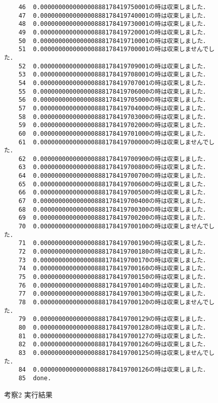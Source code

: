 \documentclass[12pt]{jarticle}
\begin{document}
\begin{figure}[t]
\begin{screen}
\small
\begin{verbatim}
    46	0.000000000000000888178419750001の時は収束しました．
    47	0.000000000000000888178419740001の時は収束しました．
    48	0.000000000000000888178419730001の時は収束しました．
    49	0.000000000000000888178419720001の時は収束しました．
    50	0.000000000000000888178419710001の時は収束しました．
    51	0.000000000000000888178419700001の時は収束しませんでした．
    52	0.000000000000000888178419709001の時は収束しました．
    53	0.000000000000000888178419708001の時は収束しました．
    54	0.000000000000000888178419707001の時は収束しました．
    55	0.000000000000000888178419706000の時は収束しました．
    56	0.000000000000000888178419705000の時は収束しました．
    57	0.000000000000000888178419704000の時は収束しました．
    58	0.000000000000000888178419703000の時は収束しました．
    59	0.000000000000000888178419702000の時は収束しました．
    60	0.000000000000000888178419701000の時は収束しました．
    61	0.000000000000000888178419700000の時は収束しませんでした．
    62	0.000000000000000888178419700900の時は収束しました．
    63	0.000000000000000888178419700800の時は収束しました．
    64	0.000000000000000888178419700700の時は収束しました．
    65	0.000000000000000888178419700600の時は収束しました．
    66	0.000000000000000888178419700500の時は収束しました．
    67	0.000000000000000888178419700400の時は収束しました．
    68	0.000000000000000888178419700300の時は収束しました．
    69	0.000000000000000888178419700200の時は収束しました．
    70	0.000000000000000888178419700100の時は収束しませんでした．
    71	0.000000000000000888178419700190の時は収束しました．
    72	0.000000000000000888178419700180の時は収束しました．
    73	0.000000000000000888178419700170の時は収束しました．
    74	0.000000000000000888178419700160の時は収束しました．
    75	0.000000000000000888178419700150の時は収束しました．
    76	0.000000000000000888178419700140の時は収束しました．
    77	0.000000000000000888178419700130の時は収束しました．
    78	0.000000000000000888178419700120の時は収束しませんでした．
    79	0.000000000000000888178419700129の時は収束しました．
    80	0.000000000000000888178419700128の時は収束しました．
    81	0.000000000000000888178419700127の時は収束しました．
    82	0.000000000000000888178419700126の時は収束しました．
    83	0.000000000000000888178419700125の時は収束しませんでした．
    84	0.000000000000000888178419700126の時は収束しました．
    85	done.
\end{verbatim}
\end{screen}
\caption{考察2 実行結果}
\label{fig:4b}
\end{figure}
\end{document}

